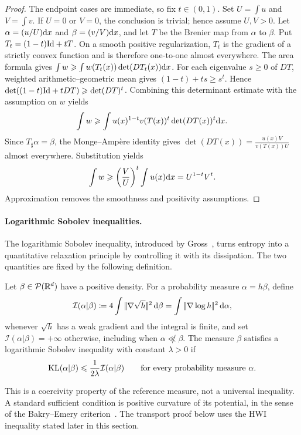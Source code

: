 \begin{proof}
	The endpoint cases are immediate, so fix $t\in(0,1)$. Set $U=\int u$ and $V=\int v$. If $U=0$ or $V=0$, the conclusion is trivial; hence assume $U,V>0$. Let $\alpha=(u/U)\mathrm{d} x$ and $\beta=(v/V)\mathrm{d} x$, and let $T$ be the Brenier map from $\alpha$ to $\beta$. Put $T_t=(1-t)\mathrm{Id}+tT$. On a smooth positive regularization, $T_t$ is the gradient of a strictly convex function and is therefore one-to-one almost everywhere. The area formula gives
	\(\int w \geqslant \int w(T_t(x))\det(DT_t(x))\mathrm{d} x\).
	For each eigenvalue $s\geq0$ of $DT$, weighted arithmetic--geometric mean gives $(1-t)+ts\geq s^t$. Hence
	\(\det((1-t)\mathrm{Id}+tDT)\geqslant\det(DT)^t\).
	Combining this determinant estimate with the assumption on $w$ yields
	\[
		\int w
		\geqslant
		\int u(x)^{1-t}v(T(x))^t\det(DT(x))^t\mathrm{d} x.
	\]
	Since $T_\sharp\alpha=\beta$, the Monge--Amp\`ere identity gives
	\(\det(DT(x))=\frac{u(x)V}{v(T(x))U}\)
	almost everywhere. Substitution yields
	\[
		\int w
		\geqslant
		\left(\frac{V}{U}\right)^t\int u(x)\mathrm{d} x
		=
		U^{1-t}V^t.
	\]
	Approximation removes the smoothness and positivity assumptions.
\end{proof}


\paragraph{Logarithmic Sobolev inequalities.}
The logarithmic Sobolev inequality, introduced by Gross~\cite{Gross1975LogSobolev}, turns entropy into a quantitative relaxation principle by controlling it with its dissipation. The two quantities are fixed by the following definition.
\begin{defn}\label{def-relative-fisher-lsi}
Let \(\beta\in\mathcal{P}(\mathbb{R}^d)\) have a positive density. For a probability measure \(\alpha=h\beta\), define
\begin{equation}\label{eq-relative-fisher-information}
	\mathcal I(\alpha|\beta)
	\coloneqq
	4\int |\!| \nabla\sqrt h |\!|^2\,\mathrm{d}\beta
	=
	\int |\!| \nabla\log h |\!|^2\,\mathrm{d}\alpha,
\end{equation}
whenever $\sqrt h$ has a weak gradient and the integral is finite, and set \(\mathcal I(\alpha|\beta)=+\infty\) otherwise, including when \(\alpha\not\ll\beta\). The measure \(\beta\) satisfies a logarithmic Sobolev inequality with constant \(\lambda>0\) if
\begin{equation}\label{eq-general-log-sobolev}
	\operatorname{KL}(\alpha|\beta)
	\leqslant
	\frac{1}{2\lambda}\mathcal I(\alpha|\beta)
	\qquad
	\text{for every probability measure }\alpha.
\end{equation}
\end{defn}
This is a coercivity property of the reference measure, not a universal inequality. A standard sufficient condition is positive curvature of its potential, in the sense of the Bakry--Emery criterion~\cite{BakryEmery1985Diffusions,BakryGentilLedoux2014Markov}. The transport proof below uses the HWI inequality stated later in this section.

